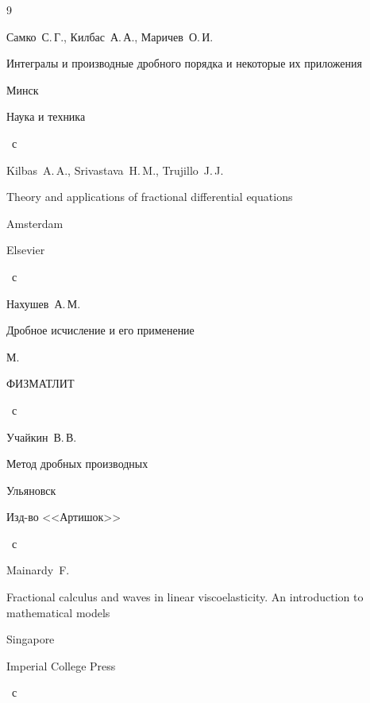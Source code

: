 \begin{thebibliography}{9}




\by Самко~С.\,Г., Килбас~А.\,А., Маричев~О.\,И.

\book Интегралы и производные дробного порядка и некоторые их приложения

\publaddr Минск

\publ Наука и техника


~с	




\by Kilbas~A.\,A., Srivastava~H.\,M., Trujillo~J.\,J.

\book Theory and applications of fractional differential equations

\publaddr Amsterdam

\publ Elsevier


~с

	


\by Нахушев~А.\,М.

\book Дробное исчисление и его применение

\publaddr М.

\publ ФИЗМАТЛИТ


~с

	


\by	Учайкин~В.\,В.

\book Метод дробных производных

\publaddr Ульяновск

\publ Изд-во <<Артишок>>


~с

	


\by Mainardy~F.

\book Fractional calculus and waves in linear viscoelasticity. An introduction to mathematical models

\publaddr Singapore

\publ  Imperial College Press


~с


\end{thebibliography}
